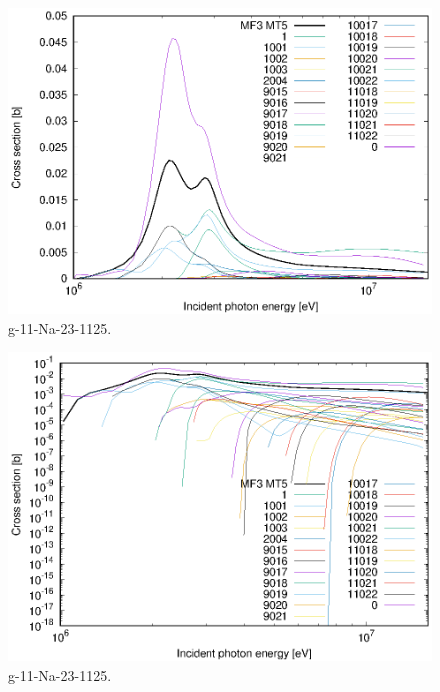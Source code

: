 \begin{figure}
 \includegraphics[width=\linewidth]{eps/g_11-Na-23_1125.eps}
  \caption{g-11-Na-23-1125.}
\end{figure}
\begin{figure}
 \includegraphics[width=\linewidth]{eps-log/g_11-Na-23_1125.eps}
 \caption{g-11-Na-23-1125.}
\end{figure}
\newpage \clearpage

